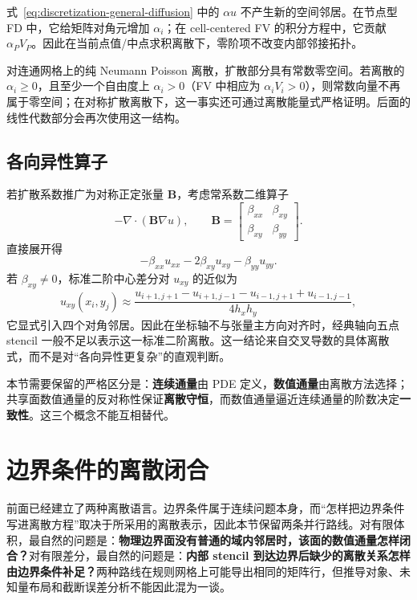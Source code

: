 式~\eqref{eq:discretization-general-diffusion} 中的 $\alpha u$ 不产生新的空间邻居。在节点型 FD 中，它给矩阵对角元增加 $\alpha_i$；在 cell-centered FV 的积分方程中，它贡献 $\alpha_PV_P$。因此在当前点值/中点求积离散下，零阶项不改变内部邻接拓扑。

对连通网格上的纯 Neumann Poisson 离散，扩散部分具有常数零空间。若离散的 $\alpha_i\ge0$，且至少一个自由度上 $\alpha_i>0$（FV 中相应为 $\alpha_iV_i>0$），则常数向量不再属于零空间；在对称扩散离散下，这一事实还可通过离散能量式严格证明。后面的线性代数部分会再次使用这一结构。

\subsection{各向异性算子}

若扩散系数推广为对称正定张量 $\bm B$，考虑常系数二维算子
\begin{equation}
-\nabla\cdot(\bm B\nabla u),
\qquad
\bm B=
\begin{bmatrix}
\beta_{xx}&\beta_{xy}\\
\beta_{xy}&\beta_{yy}
\end{bmatrix}.
\end{equation}
直接展开得
\begin{equation}
-\beta_{xx}u_{xx}
-2\beta_{xy}u_{xy}
-\beta_{yy}u_{yy}.
\label{eq:discretization-anisotropic-expanded}
\end{equation}
若 $\beta_{xy}\ne0$，标准二阶中心差分对 $u_{xy}$ 的近似为
\begin{equation}
u_{xy}(x_i,y_j)
\approx
\frac{
u_{i+1,j+1}-u_{i+1,j-1}-u_{i-1,j+1}+u_{i-1,j-1}}{4h_xh_y},
\end{equation}
它显式引入四个对角邻居。因此在坐标轴不与张量主方向对齐时，经典轴向五点 stencil 一般不足以表示这一标准二阶离散。这一结论来自交叉导数的具体离散式，而不是对“各向异性更复杂”的直观判断。

\begin{keybox}
本节需要保留的严格区分是：\textbf{连续通量}由 PDE 定义，\textbf{数值通量}由离散方法选择；共享面数值通量的反对称性保证\textbf{离散守恒}，而数值通量逼近连续通量的阶数决定\textbf{一致性}。这三个概念不能互相替代。
\end{keybox}

\section{边界条件的离散闭合}
\label{sec:discretization-boundary-conditions}

前面已经建立了两种离散语言。边界条件属于连续问题本身，而“怎样把边界条件写进离散方程”取决于所采用的离散表示，因此本节保留两条并行路线。对有限体积，最自然的问题是：\textbf{物理边界面没有普通的域内邻居时，该面的数值通量怎样闭合？}对有限差分，最自然的问题是：\textbf{内部 stencil 到达边界后缺少的离散关系怎样由边界条件补足？}两种路线在规则网格上可能导出相同的矩阵行，但推导对象、未知量布局和截断误差分析不能因此混为一谈。

